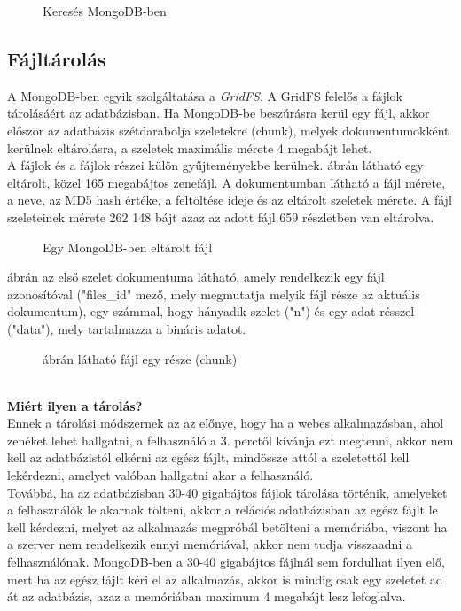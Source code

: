 			\begin{figure}[ht]
				\centering
					
					\caption{Keresés MongoDB-ben}
					\label{fig:mongodbfind}
			\end{figure}
	\subsection{Fájltárolás}
		A MongoDB-ben egyik szolgáltatása a \emph{GridFS}. A GridFS felelős a fájlok tárolásáért az adatbázisban. Ha MongoDB-be beszúrásra kerül egy fájl, akkor először az adatbázis szétdarabolja szeletekre (chunk), melyek dokumentumokként kerülnek eltárolásra, a szeletek maximális mérete 4 megabájt lehet.\\
		A fájlok és a fájlok részei külön gyűjteményekbe kerülnek.  ábrán látható egy eltárolt, közel 165 megabájtos zenefájl. A dokumentumban látható a fájl mérete, a neve, az MD5 hash értéke, a feltöltése ideje és az eltárolt szeletek mérete. A fájl szeleteinek mérete 262 148 bájt azaz az adott fájl 659 részletben van eltárolva.
		\begin{figure}[ht]
				\centering
					
					\caption{Egy MongoDB-ben eltárolt fájl}
					\label{fig:mongodbmasterfile}
		\end{figure}
		\newpage
		 ábrán az első szelet dokumentuma látható, amely rendelkezik egy fájl azonosítóval ("files\_id" mező, mely megmutatja melyik fájl része az aktuális dokumentum), egy számmal, hogy hányadik szelet ("n") és egy adat résszel ("data"), mely tartalmazza a bináris adatot.
		\\
		\begin{figure}[ht]
				\centering
					
					\caption[DUMMY]%
					{ ábrán látható fájl egy része (chunk)}
					\label{fig:mongodbfile}
		\end{figure}
		\hfill\\
		\textbf{Miért ilyen a tárolás?}
		\hfill\\
		Ennek a tárolási módszernek az az előnye, hogy ha a webes alkalmazásban, ahol zenéket lehet hallgatni, a felhasználó a 3. perctől kívánja ezt megtenni, akkor nem kell az adatbázistól elkérni az egész fájlt, mindössze attól a szeletettől kell lekérdezni, amelyet valóban hallgatni akar a felhasználó.\\
		Továbbá, ha az adatbázisban 30-40 gigabájtos fájlok tárolása történik, amelyeket a felhasználók le akarnak tölteni, akkor a relációs adatbázisban az egész fájlt le kell kérdezni, melyet az alkalmazás megpróbál betölteni a memóriába, viszont ha a szerver nem rendelkezik ennyi memóriával, akkor nem tudja visszaadni a felhasználónak.
		\newpage
		 MongoDB-ben a 30-40 gigabájtos fájlnál sem fordulhat ilyen elő, mert ha az egész fájlt kéri el az alkalmazás, akkor is mindig csak egy szeletet ad át az adatbázis, azaz a memóriában maximum 4 megabájt lesz lefoglalva.
